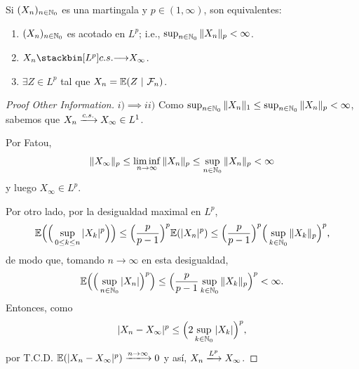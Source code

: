 \begin{theorem}
	Si $(X_{n})_{n \in \mathbb{N}_{0}}$ es una martingala y $p \in (1, \infty)$, son equivalentes:
	\begin{enumerate}
		\item $(X_{n})_{n \in \mathbb{N}_{0}}$ es acotado en $L^{p}$; i.e., $\sup_{n \in \mathbb{N}_{0}} \| X_{n} \|_{p} < \infty$.

		\item $X_{n} \stackbin[L^{p}]{c.s.}{\longrightarrow} X_{\infty}$.

		\item $\exists Z \in L^{p}$ tal que $X_{n} = \mbb{E}(Z \ | \ \mcal{F}_{n})$.
	\end{enumerate}
\end{theorem}
\begin{proof}[Proof Other Information]
	$i) \implies ii)$ Como $\sup_{n \in \mathbb{N}_{0}} \| X_{n} \|_{1} \leq \sup_{n \in \mathbb{N}_{0}} \| X_{n} \|_{p} < \infty$, sabemos que $X_{n} \xlongrightarrow{c.s.} X_{\infty} \in L^{1}$. \par
	Por Fatou,
	\[ \| X_{\infty} \|_{p} \leq \liminf_{n \to \infty} \| X_{n} \|_{p} \leq \sup_{n \in \mathbb{N}_{0}} \| X_{n} \|_{p} < \infty \]
	y luego $X_{\infty} \in L^{p}$. \par
	Por otro lado, por la desigualdad maximal en $L^{p}$,
	\[ \mathbb{E} \Big( \Big( \sup_{0 \leq k \leq n} |X_{k}|^{p} \Big) \Big) \leq \Big( \frac{p}{p-1} \Big)^{p} \mathbb{E}(|X_{n}|^{p}) \leq \Big( \frac{p}{p-1} \Big)^{p} \Big( \sup_{k \in \mathbb{N}_{0}} \| X_{k} \|_{p} \Big)^{p}, \]
	de modo que, tomando $n \to \infty$ en esta desigualdad,
	\[ \mathbb{E} \Big( \Big( \sup_{n \in \mathbb{N}_{0}} |X_{n}| \Big)^{p} \Big) \leq \Big( \frac{p}{p-1} \sup_{k \in \mathbb{N}_{0}} \| X_{k} \|_{p} \Big)^{p} < \infty. \]
	Entonces, como 
	\[ |X_{n} - X_{\infty}|^{p} \leq \Big( 2 \sup_{k \in \mathbb{N}_{0}} |X_{k}| \Big)^{p}, \]
	por T.C.D. $\mbb{E}(|X_{n} - X_{\infty}|^{p}) \xlongrightarrow{n \to \infty} 0$ y así, $X_{n} \xlongrightarrow{L^{p}} X_{\infty}$.
\end{proof}

